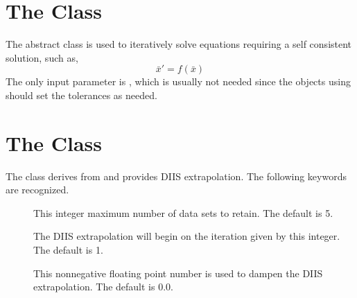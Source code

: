 
\section{The  Class}
\label{SelfConsistentExtrapolation}

The  abstract class is used
to iteratively solve equations requiring a self consistent solution,
such as,
\[ \bar{x}' = f(\bar{x}) \]
The only input parameter is , which is usually not needed
since the objects using  should set the
tolerances as needed.

\section{The  Class}
\label{DIIS}

The  class derives from 
and provides DIIS extrapolation.  The following keywords are recognized.

\begin{description}
  \item[] This integer maximum number of data sets to retain.
     The default is 5.

  \item[] The DIIS extrapolation will begin on the iteration
     given by this integer.  The default is 1.

  \item[] This nonnegative floating point number is
     used to dampen the DIIS extrapolation.  The default is 0.0.

\end{description}
